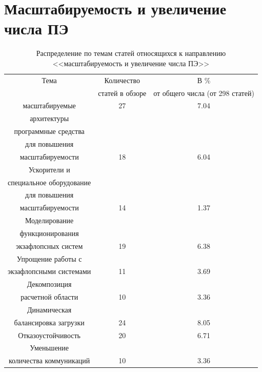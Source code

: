 \section{Масштабируемость и увеличение числа ПЭ}

 \begin{table}[ht]
 	\caption{Распределение по темам статей относящихся к направлению
 		<<масштабируемость и увеличение числа ПЭ>>}
 	\begin{center}
 		\begin{tabular}{|c|c|c|}
 			\hline
 			Тема                       & Количество          & В \%           \\
 			& статей в обзоре     & от общего числа (от 298 статей)  \\ \hline 
 			масштабируемые                 & 27 & 7.04  \\    
 			архитектуры                    &    &       \\   \hline
 			программные средства           &    &       \\
 			для повышения                  &    &       \\
 			масштабируемости              & 18 & 6.04  \\ \hline 
 			Ускорители и                   &    &      \\
 			специальное оборудование       &    &      \\
 			для повышения                  &    &      \\
 			масштабируемости              & 14 &  1.37 \\ \hline 
 			Моделирование                  &    &     \\
 			функционирования               &    &     \\
 			экзафлопсных систем            & 19 & 6.38  \\ \hline 
 			Упрощение работы с             &    &          \\
 			экзафлопсными системами       & 11 & 3.69 \\ \hline 
 			Декомпозиция                   &    &	      \\
 			расчетной области             & 10 &  3.36 \\ \hline 
 			Динамическая                   &    &       \\
 			балансировка загрузки          & 24 &  8.05 \\ \hline 
 			Отказоустойчивость             & 20 & 6.71  \\ \hline 
 			Уменьшение                     &    &        \\
 			количества коммуникаций        & 10 & 3.36   \\ \hline 
 		\end{tabular}
 	\end{center}
 	\label{topic_maxPE}
 \end{table}
 

